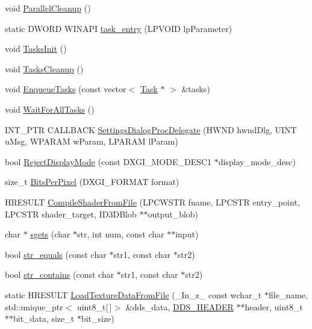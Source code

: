 \begin{DoxyCompactItemize}
void \hyperlink{namespacemage_a34c908d6d463ac859752d16e574fe8dc}{Parallel\+Cleanup} ()
\item 
static D\+W\+O\+RD W\+I\+N\+A\+PI \hyperlink{namespacemage_a1f113843a26e671776ec469adf7ccc51}{task\+\_\+entry} (L\+P\+V\+O\+ID lp\+Parameter)
\item 
void \hyperlink{namespacemage_a8252f7acebefd3efe34a15cc51e4a7ac}{Tasks\+Init} ()
\item 
void \hyperlink{namespacemage_a118ddaa5d9606328a0af412c85832e6b}{Tasks\+Cleanup} ()
\item 
void \hyperlink{namespacemage_a4d22783c8fe4d130a41b5ae001741df5}{Enqueue\+Tasks} (const vector$<$ \hyperlink{classmage_1_1_task}{Task} $\ast$ $>$ \&tasks)
\item 
void \hyperlink{namespacemage_a7da78c39175a029c92ed42d8fb9f30af}{Wait\+For\+All\+Tasks} ()
\item 
I\+N\+T\+\_\+\+P\+TR C\+A\+L\+L\+B\+A\+CK \hyperlink{namespacemage_a6b352e8d2bf3eeccf1a5dec3f1cf4130}{Settings\+Dialog\+Proc\+Delegate} (H\+W\+ND hwnd\+Dlg, U\+I\+NT u\+Msg, W\+P\+A\+R\+AM w\+Param, L\+P\+A\+R\+AM l\+Param)
\item 
bool \hyperlink{namespacemage_abdccde1f16aa2239019e1b455d8b941b}{Reject\+Display\+Mode} (const D\+X\+G\+I\+\_\+\+M\+O\+D\+E\+\_\+\+D\+E\+S\+C1 $\ast$display\+\_\+mode\+\_\+desc)
\item 
size\+\_\+t \hyperlink{namespacemage_a782fb3970da2fbbc93627f7324c193aa}{Bits\+Per\+Pixel} (D\+X\+G\+I\+\_\+\+F\+O\+R\+M\+AT format)
\item 
H\+R\+E\+S\+U\+LT \hyperlink{namespacemage_a815c989b0e968e5854959e96c5796b01}{Compile\+Shader\+From\+File} (L\+P\+C\+W\+S\+TR fname, L\+P\+C\+S\+TR entry\+\_\+point, L\+P\+C\+S\+TR shader\+\_\+target, I\+D3\+D\+Blob $\ast$$\ast$output\+\_\+blob)
\item 
char $\ast$ \hyperlink{namespacemage_aa376b0a0e5cfe0c0961c9f35555d55a6}{sgets} (char $\ast$str, int num, const char $\ast$$\ast$input)
\item 
bool \hyperlink{namespacemage_a4f78f15f269c1f65d4148983bc8224c5}{str\+\_\+equals} (const char $\ast$str1, const char $\ast$str2)
\item 
bool \hyperlink{namespacemage_a5194c40ccd591a8a8926ad7812abcd09}{str\+\_\+contains} (const char $\ast$str1, const char $\ast$str2)
\item 
static H\+R\+E\+S\+U\+LT \hyperlink{namespacemage_ad1df9b8a27dd30528717777fd0c9c3db}{Load\+Texture\+Data\+From\+File} (\+\_\+\+In\+\_\+z\+\_\+ const wchar\+\_\+t $\ast$file\+\_\+name, std\+::unique\+\_\+ptr$<$ uint8\+\_\+t\mbox{[}$\,$\mbox{]}$>$ \&dds\+\_\+data, \hyperlink{structmage_1_1_d_d_s___h_e_a_d_e_r}{D\+D\+S\+\_\+\+H\+E\+A\+D\+ER} $\ast$$\ast$header, uint8\+\_\+t $\ast$$\ast$bit\+\_\+data, size\+\_\+t $\ast$bit\+\_\+size)

\end{DoxyCompactItemize}
